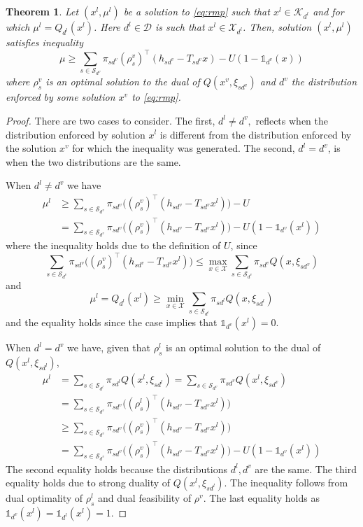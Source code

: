 \documentclass[12pt]{article}
\newtheorem{theorem}{Theorem}%
\theoremstyle{thmstylethree}%
\newcommand{\mtc}[1] {\mathcal{#1}}
\def\Ind{\ensuremath{\mathbb{1}}}
\begin{document}
\begin{theorem}\label{prop:oc:continuous:safe}
Let $(x^l,\mu^l)$ be a solution to \eqref{eq:rmp} such that $x^l\in\mtc{K}_{d^l}$ and for which $\mu^l = Q_{d^l}(x^l)$. 
Here $d^l\in\mtc{D}$ is such that $x^l\in\mtc{X}_{d^l}$. 
Then, solution $(x^l,\mu^l)$ satisfies inequality
\begin{equation}
    \mu\geq \sum_{s\in\mtc{S}_{d^v}}\pi_{sd^v}(\rho^v_s)^\top(h_{sd^v}-T_{sd^v}x) - U(1-\Ind_{d^v}(x))
\end{equation}
where $\rho^v_s$ is an optimal solution to the dual of $Q(x^v,\xi_{sd^v})$ and $d^v$ the distribution enforced by some solution $x^v$ to \eqref{eq:rmp}.
\end{theorem}
\begin{proof}
There are two cases to consider. The first, $d^l \neq d^v,$ reflects when the distribution enforced by solution $x^l$ is different from the distribution enforced by the solution $x^v$ for which the inequality was generated. The second, $d^l = d^v$, is when the two distributions are the same. 

When $d^l \neq d^v$ we have 
\begin{align*}
    \mu^l &\geq \sum_{s\in\mtc{S}_{d^v}}\pi_{sd^v}\bigg((\rho^v_s)^\top(h_{sd^v}-T_{sd^v}x^l)\bigg)- U\\
    &=\sum_{s\in\mtc{S}_{d^v}}\pi_{sd^v}\bigg((\rho^v_s)^\top(h_{sd^v}-T_{sd^v}x^l)\bigg)- U(1-\Ind_{d^v}(x^l))
\end{align*}
where the inequality holds due to the definition of $U$, since 
$$\sum_{s\in\mtc{S}_{d^v}}\pi_{sd^v}\bigg((\rho^v_s)^\top(h_{sd^v}-T_{sd^v}x^l)\bigg)\leq \max_{x\in\mtc{X}}\sum_{s\in\mtc{S}_{d^v}}\pi_{sd^v}Q(x,\xi_{sd^v})$$
and 
$$\mu^l = Q_{d^l}(x^l)\geq \min_{x\in\mtc{X}}\sum_{s\in\mtc{S}_{d^l}}\pi_{sd^l}Q(x,\xi_{sd^l})$$
and the equality holds since the case implies that $\Ind_{d^v}(x^l)=0$.

When $d^l=d^v$ we have, given that $\rho^l_s$ is an optimal solution to the dual of $Q(x^l,\xi_{sd^l})$,
\begin{align*}
    \mu^l &=\sum_{s\in\mtc{S}_{d^l}}\pi_{sd^l}Q(x^l,\xi_{sd^l})=\sum_{s\in\mtc{S}_{d^v}}\pi_{sd^v}Q(x^l,\xi_{sd^v})\\
    &=\sum_{s\in\mtc{S}_{d^v}}\pi_{sd^v}\bigg((\rho^l_s)^\top(h_{sd^v}-T_{sd^v}x^l)\bigg)\\
    &\geq \sum_{s\in\mtc{S}_{d^v}}\pi_{sd^v}\bigg((\rho^v_s)^\top(h_{sd^v}-T_{sd^v}x^l)\bigg)\\
    &= \sum_{s\in\mtc{S}_{d^v}}\pi_{sd^v}\bigg((\rho^v_s)^\top(h_{sd^v}-T_{sd^v}x^l)\bigg)-U(1-\Ind_{d^v}(x^l))
\end{align*}
The second equality holds because the distributions $d^l,d^v$ are the same. The third equality holds due to strong duality of $Q(x^l,\xi_{sd^l})$. 
The inequality follows from dual optimality of $\rho^l_s$ and dual feasibility of $\rho^v$. The last equality holds as $\Ind_{d^v}(x^l)=\Ind_{d^l}(x^l)=1$.
\end{proof}
\end{document}
